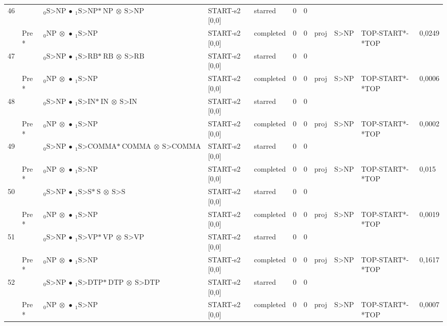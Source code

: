 \documentclass[10pt]{article}
\begin{document}
\begin{longtable}[htbp]{lllllllllll}
46 & & $ {}_0 \textrm{S>NP} \  \bullet \ {}_{1} \textrm{S>NP*} \ \textrm{NP} \  \otimes \ \textrm{S>NP} $ & START-s2 [0,0] & starred & 0 & 0 & & & & \\ 
 & Pre *& $ {}_0 \textrm{NP} \  \otimes \  \bullet \ {}_{1} \textrm{S>NP} $ & START-s2 [0,0] & completed & 0 & 0 & proj & S>NP & TOP-START*-*TOP & 0,0249 \\ 
47 & & $ {}_0 \textrm{S>NP} \  \bullet \ {}_{1} \textrm{S>RB*} \ \textrm{RB} \  \otimes \ \textrm{S>RB} $ & START-s2 [0,0] & starred & 0 & 0 & & & & \\ 
 & Pre *& $ {}_0 \textrm{NP} \  \otimes \  \bullet \ {}_{1} \textrm{S>NP} $ & START-s2 [0,0] & completed & 0 & 0 & proj & S>NP & TOP-START*-*TOP & 0,0006 \\ 
48 & & $ {}_0 \textrm{S>NP} \  \bullet \ {}_{1} \textrm{S>IN*} \ \textrm{IN} \  \otimes \ \textrm{S>IN} $ & START-s2 [0,0] & starred & 0 & 0 & & & & \\ 
 & Pre *& $ {}_0 \textrm{NP} \  \otimes \  \bullet \ {}_{1} \textrm{S>NP} $ & START-s2 [0,0] & completed & 0 & 0 & proj & S>NP & TOP-START*-*TOP & 0,0002 \\ 
49 & & $ {}_0 \textrm{S>NP} \  \bullet \ {}_{1} \textrm{S>COMMA*} \ \textrm{COMMA} \  \otimes \ \textrm{S>COMMA} $ & START-s2 [0,0] & starred & 0 & 0 & & & & \\ 
 & Pre *& $ {}_0 \textrm{NP} \  \otimes \  \bullet \ {}_{1} \textrm{S>NP} $ & START-s2 [0,0] & completed & 0 & 0 & proj & S>NP & TOP-START*-*TOP & 0,015 \\ 
50 & & $ {}_0 \textrm{S>NP} \  \bullet \ {}_{1} \textrm{S>S*} \ \textrm{S} \  \otimes \ \textrm{S>S} $ & START-s2 [0,0] & starred & 0 & 0 & & & & \\ 
 & Pre *& $ {}_0 \textrm{NP} \  \otimes \  \bullet \ {}_{1} \textrm{S>NP} $ & START-s2 [0,0] & completed & 0 & 0 & proj & S>NP & TOP-START*-*TOP & 0,0019 \\ 
51 & & $ {}_0 \textrm{S>NP} \  \bullet \ {}_{1} \textrm{S>VP*} \ \textrm{VP} \  \otimes \ \textrm{S>VP} $ & START-s2 [0,0] & starred & 0 & 0 & & & & \\ 
 & Pre *& $ {}_0 \textrm{NP} \  \otimes \  \bullet \ {}_{1} \textrm{S>NP} $ & START-s2 [0,0] & completed & 0 & 0 & proj & S>NP & TOP-START*-*TOP & 0,1617 \\ 
52 & & $ {}_0 \textrm{S>NP} \  \bullet \ {}_{1} \textrm{S>DTP*} \ \textrm{DTP} \  \otimes \ \textrm{S>DTP} $ & START-s2 [0,0] & starred & 0 & 0 & & & & \\ 
 & Pre *& $ {}_0 \textrm{NP} \  \otimes \  \bullet \ {}_{1} \textrm{S>NP} $ & START-s2 [0,0] & completed & 0 & 0 & proj & S>NP & TOP-START*-*TOP & 0,0007 \\ 

\end{longtable}
\end{document}
